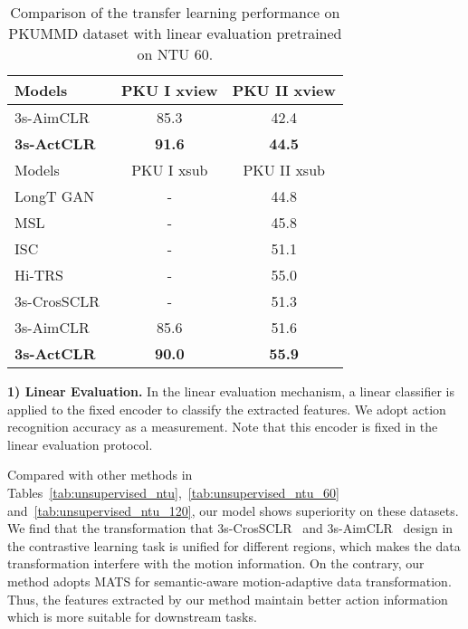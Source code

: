 \documentclass[twocolumn]{article}
\begin{document}
\begin{table}[tb]
    \small
    \centering
    \caption{Comparison of the transfer learning performance on PKUMMD dataset with linear evaluation pretrained on NTU 60.}
    \begin{tabular}{l|c|c}
        \toprule
    Models&PKU I xview& PKU II xview\\
      \midrule
      3s-AimCLR~\cite{guo2021contrastive} & 85.3 & 42.4 \\
      \textbf{3s-ActCLR} & \textbf{91.6} &\textbf{44.5}\\
      \midrule
      \midrule
     Models& PKU I xsub& PKU II xsub\\
      \midrule
      LongT GAN~\cite{zheng2018unsupervised} & - & 44.8 \\
      MSL~\cite{lin2020ms2l} & - & 45.8\\
      ISC~\cite{thoker2021skeleton} & - & 51.1\\
      Hi-TRS~\cite{chen2022hierarchically} & - & 55.0\\
      3s-CrosSCLR~\cite{li20213d} & - & 51.3\\
      3s-AimCLR~\cite{guo2021contrastive} & 85.6 & 51.6 \\
      \textbf{3s-ActCLR} & \textbf{90.0} &\textbf{55.9}\\
      \bottomrule
  \end{tabular}
    \label{tab:trans_pku}
  \end{table}

\noindent\textbf{1) Linear Evaluation.}
In the linear evaluation mechanism, a linear classifier  is applied to the fixed encoder  to classify the extracted features. We adopt action recognition accuracy as a measurement. Note that this encoder  is fixed in the linear evaluation protocol.

Compared with other methods in Tables~\ref{tab:unsupervised_ntu},~\ref{tab:unsupervised_ntu_60} and~\ref{tab:unsupervised_ntu_120}, our model shows superiority on these datasets. We find that the transformation that 3s-CrosSCLR~\cite{li20213d} and 3s-AimCLR~\cite{guo2021contrastive} design in the contrastive learning task is unified for different regions, which makes the data transformation interfere with the motion information. On the contrary, our method adopts MATS for semantic-aware motion-adaptive data transformation. Thus, the features extracted by our method maintain better action information which is more suitable for downstream tasks. 

\vspace{1mm}
\end{document}
